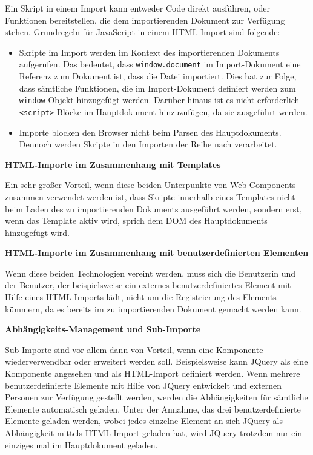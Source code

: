 Ein Skript in einem Import kann entweder Code direkt ausführen, oder Funktionen bereitstellen, die dem importierenden Dokument zur Verfügung stehen. Grundregeln für JavaScript in einem HTML-Import sind folgende:
\begin{itemize}
\item Skripte im Import werden im Kontext des importierenden Dokuments aufgerufen. Das bedeutet, dass \lstinline|window.document| im Import-Dokument eine Referenz zum Dokument ist, dass die Datei importiert. Dies hat zur Folge, dass sämtliche Funktionen, die im Import-Dokument definiert werden zum \lstinline|window|-Objekt hinzugefügt werden. Darüber hinaus ist es nicht erforderlich \lstinline|<script>|-Blöcke im Hauptdokument hinzuzufügen, da sie ausgeführt werden.
\item Importe blocken den Browser nicht beim Parsen des Hauptdokuments. Dennoch werden Skripte in den Importen der Reihe nach verarbeitet.
\end{itemize}

\textbf{HTML-Importe im Zusammenhang mit Templates}

Ein sehr großer Vorteil, wenn diese beiden Unterpunkte von Web-Components zusammen verwendet werden ist, dass Skripte innerhalb eines Templates nicht beim Laden des zu importierenden Dokuments ausgeführt werden, sondern erst, wenn das Template aktiv wird, sprich dem DOM des Hauptdokuments hinzugefügt wird.

\textbf{HTML-Importe im Zusammenhang mit benutzerdefinierten Elementen}

Wenn diese beiden Technologien vereint werden, muss sich die Benutzerin und der Benutzer, der beispielsweise ein externes benutzerdefiniertes Element mit Hilfe eines HTML-Imports lädt, nicht um die Registrierung des Elements kümmern, da es bereits im zu importierenden Dokument gemacht werden kann.

\textbf{Abhängigkeits-Management und Sub-Importe}

Sub-Importe sind vor allem dann von Vorteil, wenn eine Komponente wiederverwendbar oder erweitert werden soll. Beispielsweise kann JQuery als eine Komponente angesehen und als HTML-Import definiert werden. Wenn mehrere  benutzerdefinierte Elemente mit Hilfe von JQuery entwickelt und externen Personen zur Verfügung gestellt werden, werden die Abhängigkeiten für sämtliche Elemente automatisch geladen. Unter der Annahme, das drei benutzerdefinierte Elemente geladen werden, wobei jedes einzelne Element an sich JQuery als Abhängigkeit mittels HTML-Import geladen hat, wird JQuery trotzdem nur ein einziges mal im Hauptdokument geladen.